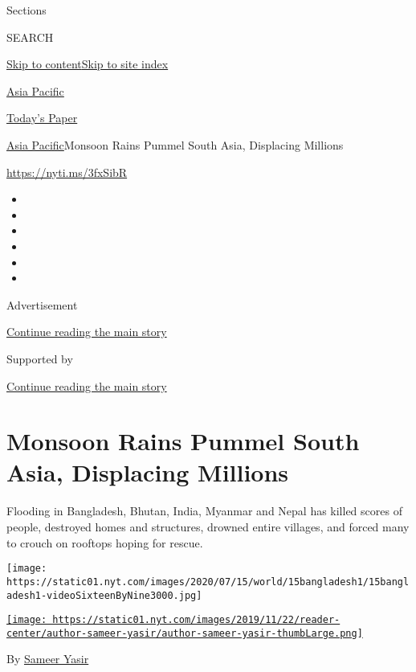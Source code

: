 Sections

SEARCH

\protect\hyperlink{site-content}{Skip to
content}\protect\hyperlink{site-index}{Skip to site index}

\href{https://www.nytimes.com/section/world/asia}{Asia Pacific}

\href{https://myaccount.nytimes.com/auth/login?response_type=cookie\&client_id=vi}{}

\href{https://www.nytimes.com/section/todayspaper}{Today's Paper}

\href{/section/world/asia}{Asia Pacific}\textbar{}Monsoon Rains Pummel
South Asia, Displacing Millions

\url{https://nyti.ms/3fxSibR}

\begin{itemize}
\item
\item
\item
\item
\item
\item
\end{itemize}

Advertisement

\protect\hyperlink{after-top}{Continue reading the main story}

Supported by

\protect\hyperlink{after-sponsor}{Continue reading the main story}

\hypertarget{monsoon-rains-pummel-south-asia-displacing-millions}{%
\section{Monsoon Rains Pummel South Asia, Displacing
Millions}\label{monsoon-rains-pummel-south-asia-displacing-millions}}

Flooding in Bangladesh, Bhutan, India, Myanmar and Nepal has killed
scores of people, destroyed homes and structures, drowned entire
villages, and forced many to crouch on rooftops hoping for rescue.

\texttt{[image: https://static01.nyt.com/images/2020/07/15/world/15bangladesh1/15bangladesh1-videoSixteenByNine3000.jpg]}

\href{https://www.nytimes.com/by/sameer-yasir}{\texttt{[image: https://static01.nyt.com/images/2019/11/22/reader-center/author-sameer-yasir/author-sameer-yasir-thumbLarge.png]}}

By \href{https://www.nytimes.com/by/sameer-yasir}{Sameer Yasir}

